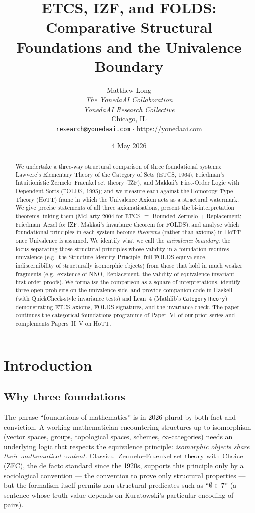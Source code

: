 \documentclass[12pt]{article}
\title{ETCS, IZF, and FOLDS:\\
Comparative Structural Foundations and the Univalence Boundary}
\author{Matthew Long \\
\textit{The YonedaAI Collaboration} \\
\textit{YonedaAI Research Collective} \\
Chicago, IL \\
\texttt{research@yonedaai.com} $\cdot$ \url{https://yonedaai.com}}
\date{4 May 2026}
\theoremstyle{definition}
\theoremstyle{remark}
\begin{document}
\maketitle

\begin{abstract}
We undertake a three-way structural comparison of three foundational systems: Lawvere's
Elementary Theory of the Category of Sets (ETCS, 1964), Friedman's Intuitionistic
Zermelo--Fraenkel set theory (IZF), and Makkai's First-Order Logic with Dependent Sorts
(FOLDS, 1995); and we measure each against the Homotopy Type Theory (HoTT) frame in
which the Univalence Axiom acts as a structural watermark. We give precise statements of
all three axiomatisations, present the bi-interpretation theorems linking them
(McLarty 2004 for ETCS $\equiv$ Bounded Zermelo + Replacement; Friedman--Aczel for IZF;
Makkai's invariance theorem for FOLDS), and analyse which foundational principles in each
system become \emph{theorems} (rather than axioms) in HoTT once Univalence is assumed.
We identify what we call the \emph{univalence boundary}: the locus separating those
structural principles whose validity in a foundation requires univalence (e.g.\ the
Structure Identity Principle, full FOLDS-equivalence, indiscernibility of structurally
isomorphic objects) from those that hold in much weaker fragments (e.g.\ existence of
NNO, Replacement, the validity of equivalence-invariant first-order proofs). We
formalise the comparison as a square of interpretations, identify three open problems on
the univalence side, and provide companion code in Haskell (with QuickCheck-style
invariance tests) and Lean~4 (Mathlib's \texttt{CategoryTheory}) demonstrating ETCS
axioms, FOLDS signatures, and the invariance check. The paper continues the categorical
foundations programme of Paper~VI of our prior series and complements Papers~II--V on
HoTT.
\end{abstract}

\tableofcontents

\section{Introduction}
\label{sec:intro}

\subsection{Why three foundations}

The phrase ``foundations of mathematics'' is in 2026 plural by both fact and conviction.
A working mathematician encountering structures up to isomorphism (vector spaces, groups,
topological spaces, schemes, $\infty$-categories) needs an underlying logic that respects
the equivalence principle: \emph{isomorphic objects share their mathematical content}.
Classical Zermelo--Fraenkel set theory with Choice (ZFC), the de facto standard since the
1920s, supports this principle only by a sociological convention --- the convention to
prove only structural properties --- but the formalism itself permits non-structural
predicates such as ``$\emptyset \in 7$'' (a sentence whose truth value depends on
Kuratowski's particular encoding of pairs).
\end{document}
